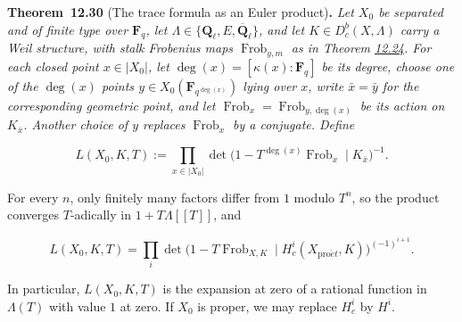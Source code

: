 \documentclass[11pt]{article}
\newenvironment{bpstatement}[2]{\par\addvspace{0.6\baselineskip}\noindent\textbf{#1}#2\textbf{.}\enspace\ignorespaces}
  {\par\addvspace{0.4\baselineskip}}
\newenvironment{bpstatementit}[2]{\begin{bpstatement}{#1}{#2}\itshape\ignorespaces}{\end{bpstatement}}
\providecommand{\Dbc}{}\renewcommand{\Dbc}{D^b_c}
\begin{document}
\label{bp317}%
\begin{bpstatementit}{Theorem~12.30}{ (The trace formula as an Euler product)}
Let \(X_0\) be separated and of finite type over \(\mathbf F_q\), let \(\Lambda\in\{\mathbf Q_\ell,E,\overline{\mathbf Q}_\ell\}\), and let \(K\in\Dbc(X,\Lambda)\) carry a Weil structure, with stalk Frobenius maps \(\operatorname{Frob}_{y,m}\) as in Theorem \hyperref[bp298]{12.24}. For each closed point \(x\in|X_0|\), let \(\deg(x)=[\kappa(x):\mathbf F_q]\) be its degree, choose one of the \(\deg(x)\) points \(y\in X_0(\mathbf F_{q^{\deg(x)}})\) lying over \(x\), write \(\bar x=\bar y\) for the corresponding geometric point, and let \(\operatorname{Frob}_x=\operatorname{Frob}_{y,\deg(x)}\) be its action on \(K_{\bar x}\). Another choice of \(y\) replaces \(\operatorname{Frob}_x\) by a conjugate. Define

\[
L(X_0,K,T)
:=\prod_{x\in|X_0|}
\det\bigl(1-T^{\deg(x)}\operatorname{Frob}_x\mid K_{\bar x}\bigr)^{-1}.
\tag{12.6}
\]

For every \(n\), only finitely many factors differ from \(1\) modulo \(T^n\), so the product converges \(T\)-adically in \(1+T\Lambda[[T]]\), and

\[
L(X_0,K,T)
=\prod_i\det\bigl(1-T\operatorname{Frob}_{X,K}\mid H_c^i(X_{\mathrm{pro}\acute{e}t},K)\bigr)^{(-1)^{i+1}}.
\tag{12.7}
\]

In particular, \(L(X_0,K,T)\) is the expansion at zero of a rational function in \(\Lambda(T)\) with value \(1\) at zero. If \(X_0\) is proper, we may replace \(H_c^i\) by \(H^i\).
\end{bpstatementit}
\end{document}
